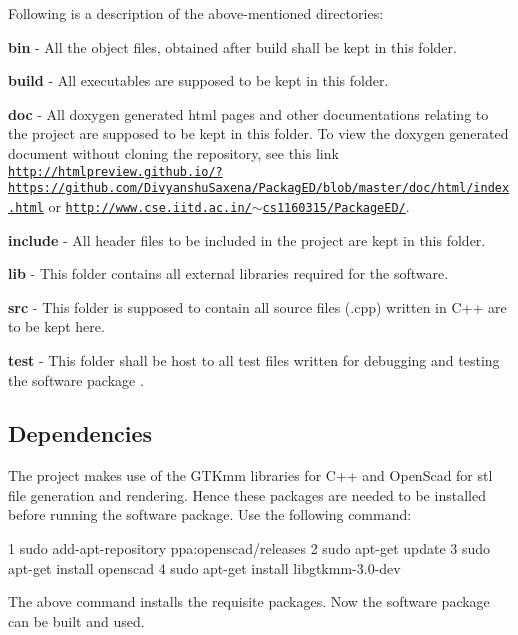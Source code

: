 Following is a description of the above-\/mentioned directories\+:
\begin{DoxyEnumerate}
\item {\bfseries bin} -\/ All the object files, obtained after build shall be kept in this folder.
\item {\bfseries build} -\/ All executables are supposed to be kept in this folder.
\item {\bfseries doc} -\/ All doxygen generated html pages and other documentations relating to the project are supposed to be kept in this folder. To view the doxygen generated document without cloning the repository, see this link \href{http://htmlpreview.github.io/?https://github.com/DivyanshuSaxena/PackagED/blob/master/doc/html/index.html}{\tt http\+://htmlpreview.\+github.\+io/?https\+://github.\+com/\+Divyanshu\+Saxena/\+Packag\+E\+D/blob/master/doc/html/index.\+html} or \href{http://www.cse.iitd.ac.in/~cs1160315/PackageED/}{\tt http\+://www.\+cse.\+iitd.\+ac.\+in/$\sim$cs1160315/\+Package\+E\+D/}.
\item {\bfseries include} -\/ All header files to be included in the project are kept in this folder.
\item {\bfseries lib} -\/ This folder contains all external libraries required for the software.
\item {\bfseries src} -\/ This folder is supposed to contain all source files (.cpp) written in C++ are to be kept here.
\item {\bfseries test} -\/ This folder shall be host to all test files written for debugging and testing the software package .
\end{DoxyEnumerate}

\subsection*{Dependencies}

The project makes use of the G\+T\+Kmm libraries for C++ and Open\+Scad for stl file generation and rendering. Hence these packages are needed to be installed before running the software package. Use the following command\+: 
\begin{DoxyCode}
1 sudo add-apt-repository ppa:openscad/releases  
2 sudo apt-get update  
3 sudo apt-get install openscad 
4 sudo apt-get install libgtkmm-3.0-dev
\end{DoxyCode}
 The above command installs the requisite packages. Now the software package can be built and used.

